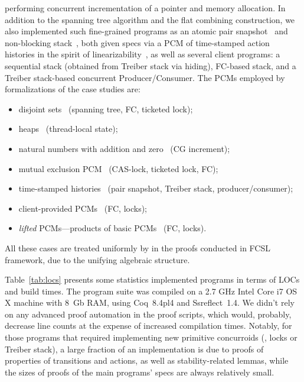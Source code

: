 performing concurrent incrementation of a pointer and memory
allocation. In addition to the spanning tree algorithm and the flat
combining construction, we also implemented such fine-grained programs
as an atomic pair snapshot~\cite{Qadeer-al:TR09,Liang-Feng:PLDI13} and
non-blocking stack~\cite{Treiber:TR}, both given specs via a PCM of
time-stamped action histories in the spirit of
linearizability~\cite{Sergey-al:ESOP15,Herlihy-Wing:TOPLAS90}, as well
as several client programs: a sequential stack (obtained from Treiber
stack via hiding), FC-based stack, and a Treiber stack-based
concurrent Producer/Consumer.
%
The PCMs employed by formalizations of the case studies are:
%
\begin{itemize}[itemindent=0pt] 

\item disjoint sets~\cite{Nanevski-al:ESOP14} (spanning tree, FC, ticketed lock);
\item heaps~\cite{LeyWild-Nanevski:POPL13,Calcagno-al:LICS07} (thread-local state);
\item natural numbers with addition and zero~\cite{LeyWild-Nanevski:POPL13} (CG increment);
\item mutual exclusion PCM~\cite{LeyWild-Nanevski:POPL13,Nanevski-al:ESOP14} (CAS-lock, ticketed lock, FC);
\item time-stamped histories~\cite{Sergey-al:ESOP15} (pair snapshot, Treiber stack, producer/consumer);
\item client-provided PCMs~\cite{LeyWild-Nanevski:POPL13,Nanevski-al:ESOP14} (FC, locks);
\item \emph{lifted} PCMs---products of basic PCMs~\cite{LeyWild-Nanevski:POPL13,Nanevski-al:ESOP14} (FC, locks). 

\end{itemize}
%
All these cases are treated uniformly by in the proofs conducted in FCSL
framework, due to the unifying algebraic structure.


Table~\ref{tab:locs} presents some statistics \wrt implemented
programs in terms of LOCs and build times.  The program suite was
compiled on a 2.7 GHz Intel Core i7 OS X machine with 8~Gb RAM, using
Coq~8.4pl4 and Ssreflect~1.4.
%
We didn't rely on any advanced proof automation in the proof scripts,
which would, probably, decrease line counts at the expense of
increased compilation times. Notably, for those programs that required
implementing new primitive concurroids (\eg, locks or Treiber stack),
a large fraction of an implementation is due to proofs of properties
of transitions and actions, as well as stability-related lemmas, while
the sizes of proofs of the main programs' specs are always relatively
small.

